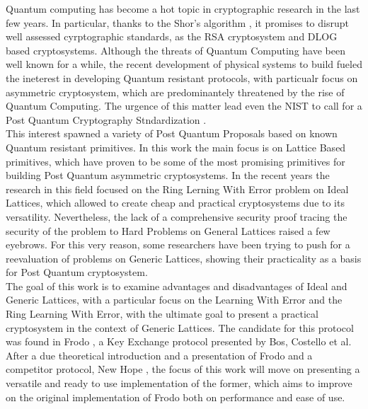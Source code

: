 Quantum computing has become a hot topic in cryptographic research in the last few years. In particular, thanks to the Shor's algorithm \cite{ShorAlgo}, it promises to disrupt well assessed cyrptographic standards, as the RSA cryptosystem and DLOG based cryptosystems. Although the threats of Quantum Computing have been well known for a while, the recent development of physical systems to build fueled the ineterest in developing Quantum resistant protocols, with particualr focus on asymmetric cryptosystem, which are predominantely threatened by the rise of Quantum Computing. The urgence of this matter lead even the NIST to call for a Post Quantum Cryptography Stndardization \cite{NIST}.\\
This interest spawned a variety of Post Quantum Proposals based on known Quantum resistant primitives. In this work the main focus is on Lattice Based primitives, which have proven to be some of the most promising primitives for building Post Quantum asymmetric cryptosystems. In the recent years the research in this field focused on the Ring Lerning With Error problem on Ideal Lattices, which allowed to create cheap and practical cryptosystems due to its versatility. Nevertheless, the lack of a comprehensive security proof tracing the security of the problem to Hard Problems on General Lattices raised a few eyebrows. For this very reason, some researchers have been trying to push for a reevaluation of problems on Generic Lattices, showing their practicality as a basis for Post Quantum cryptosystem.\\
The goal of this work is to examine advantages and disadvantages of Ideal and Generic Lattices, with a particular focus on the Learning With Error and the Ring Learning With Error, with the ultimate goal to present a practical cryptosystem in the context of Generic Lattices. The candidate for this protocol was found in Frodo \cite{frodo}, a Key Exchange protocol presented by Bos, Costello et al. After a due theoretical introduction and a presentation of Frodo and a competitor protocol, New Hope \cite{newhope}, the focus of this work will move on presenting a versatile and ready to use implementation of the former, which aims to improve on the original implementation of Frodo both on performance and ease of use.